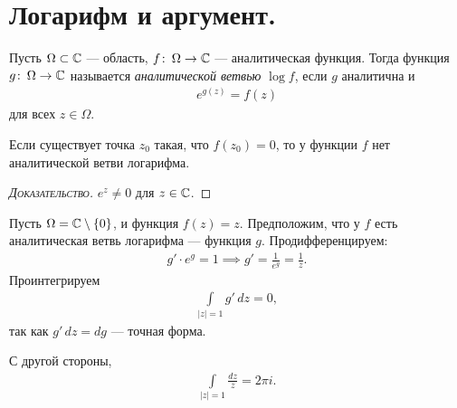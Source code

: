 \documentclass[../../main.tex]{subfiles}
\begin{document}
\section{Логарифм и аргумент.}

\begin{df}
 Пусть $ \Omega  \subset \mathbb{C}$ --- область, $ f \colon\, \Omega \to \mathbb{C}   $ --- аналитическая функция. Тогда функция $ g \colon\, \Omega \to \mathbb{C}   $ называется \textit{аналитической ветвью} $ \log f $, если $ g $ аналитична и
 \begin{align*}
  e^{g(z)} = f(z)
 \end{align*} для всех $ z \in \Omega $.
\end{df}
\begin{remrk}
 Если существует точка $ z_0 $ такая, что $ f(z_0) = 0 $, то у функции $ f $ нет аналитической ветви логарифма. 
\end{remrk}
\begin{proof}[\normalfont\textsc{Доказательство}]
 $ e^{z} \neq 0 $ для $ z \in \mathbb{C} $.
\end{proof}

\begin{exmpl}
 Пусть $ \Omega = \mathbb{C} \setminus \left\{ 0 \right\} $, и функция $ f(z) = z $. Предположим, что у $ f $ есть аналитическая ветвь логарифма --- функция $ g $. Продифференцируем:
 \begin{align*}
  g' \cdot e^{g} = 1 \implies g' = \frac{1}{e^{g}} = \frac{1}{z}.
 \end{align*} Проинтегрируем
 \begin{align*}
  \int\limits_{\left| z \right|=1} g'\,dz = 0,
 \end{align*} так как $ g'\,dz = dg $ --- точная форма.

 С другой стороны,
 \begin{align*}
  \int\limits_{\left| z \right|=1}   \frac{dz}{z} = 2\pi i.
 \end{align*}
\end{exmpl}
\end{document}
